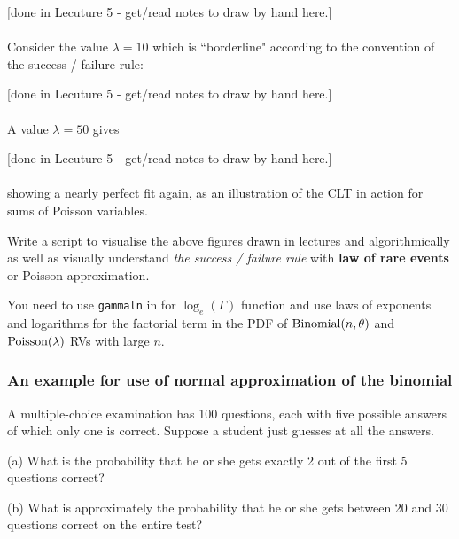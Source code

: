 {\scriptsize [done in Lecuture 5 - get/read notes to draw by hand here.]}\\
\vspace{3cm} 
~\\


Consider the value $\lambda =10$ which is ``borderline" according to the
convention of the success / failure rule: 


{\scriptsize [done in Lecuture 5 - get/read notes to draw by hand here.]}\\
\vspace{3cm} 
~\\


A value $\lambda =50$ gives 


{\scriptsize [done in Lecuture 5 - get/read notes to draw by hand here.]}\\
\vspace{3cm} 
~\\


showing a nearly perfect
fit again, as an illustration of the CLT in action for sums of Poisson
variables.

\begin{labwork}\label{LW:VisualiseSuccessFailureRulePoisson}
Write a \Matlab script to visualise the above figures drawn in lectures and algorithmically as well as visually understand {\em the success / failure rule} with {\bf law of rare events} or Poisson approximation.

You need to use {\tt gammaln} in \Matlab for $\log_e(\Gamma)$ function and use laws of exponents and logarithms for the factorial term in the PDF of $\mbox{{\rm Binomial}}(n,\theta)$ and $\mbox{{\rm Poisson}}(\lambda)$ RVs with large $n$.
\end{labwork}

\subsubsection{An example for use of normal approximation of the binomial}

\begin{Exercise}[label={ExMultipleChoiceQuestions}]
A multiple-choice examination has 100 questions, each
with five possible answers of which only one is correct. Suppose a student
just guesses at all the answers.

(a) What is the probability that he or she gets exactly 2 out of the first 5
questions correct?

(b) What is approximately the probability that he or she gets between 20 and
30 questions correct on the entire test?

\end{Exercise}


